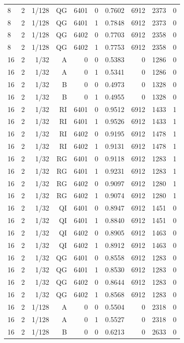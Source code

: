\begin{longtable}{lrrrrrrrrr}
8 & 2 & 1/128 & QG & 6401 & 0 & 0.7602 & 6912 & 2373 & 0 \\
8 & 2 & 1/128 & QG & 6401 & 1 & 0.7848 & 6912 & 2373 & 0 \\
8 & 2 & 1/128 & QG & 6402 & 0 & 0.7703 & 6912 & 2358 & 0 \\
8 & 2 & 1/128 & QG & 6402 & 1 & 0.7753 & 6912 & 2358 & 0 \\
16 & 2 & 1/32 & A & 0 & 0 & 0.5383 & 0 & 1286 & 0 \\
16 & 2 & 1/32 & A & 0 & 1 & 0.5341 & 0 & 1286 & 0 \\
16 & 2 & 1/32 & B & 0 & 0 & 0.4973 & 0 & 1328 & 0 \\
16 & 2 & 1/32 & B & 0 & 1 & 0.4955 & 0 & 1328 & 0 \\
16 & 2 & 1/32 & RI & 6401 & 0 & 0.9512 & 6912 & 1433 & 1 \\
16 & 2 & 1/32 & RI & 6401 & 1 & 0.9526 & 6912 & 1433 & 1 \\
16 & 2 & 1/32 & RI & 6402 & 0 & 0.9195 & 6912 & 1478 & 1 \\
16 & 2 & 1/32 & RI & 6402 & 1 & 0.9131 & 6912 & 1478 & 1 \\
16 & 2 & 1/32 & RG & 6401 & 0 & 0.9118 & 6912 & 1283 & 1 \\
16 & 2 & 1/32 & RG & 6401 & 1 & 0.9231 & 6912 & 1283 & 1 \\
16 & 2 & 1/32 & RG & 6402 & 0 & 0.9097 & 6912 & 1280 & 1 \\
16 & 2 & 1/32 & RG & 6402 & 1 & 0.9074 & 6912 & 1280 & 1 \\
16 & 2 & 1/32 & QI & 6401 & 0 & 0.8947 & 6912 & 1451 & 0 \\
16 & 2 & 1/32 & QI & 6401 & 1 & 0.8840 & 6912 & 1451 & 0 \\
16 & 2 & 1/32 & QI & 6402 & 0 & 0.8905 & 6912 & 1463 & 0 \\
16 & 2 & 1/32 & QI & 6402 & 1 & 0.8912 & 6912 & 1463 & 0 \\
16 & 2 & 1/32 & QG & 6401 & 0 & 0.8558 & 6912 & 1283 & 0 \\
16 & 2 & 1/32 & QG & 6401 & 1 & 0.8530 & 6912 & 1283 & 0 \\
16 & 2 & 1/32 & QG & 6402 & 0 & 0.8644 & 6912 & 1283 & 0 \\
16 & 2 & 1/32 & QG & 6402 & 1 & 0.8568 & 6912 & 1283 & 0 \\
16 & 2 & 1/128 & A & 0 & 0 & 0.5504 & 0 & 2318 & 0 \\
16 & 2 & 1/128 & A & 0 & 1 & 0.5527 & 0 & 2318 & 0 \\
16 & 2 & 1/128 & B & 0 & 0 & 0.6213 & 0 & 2633 & 0 \\

\end{longtable}
